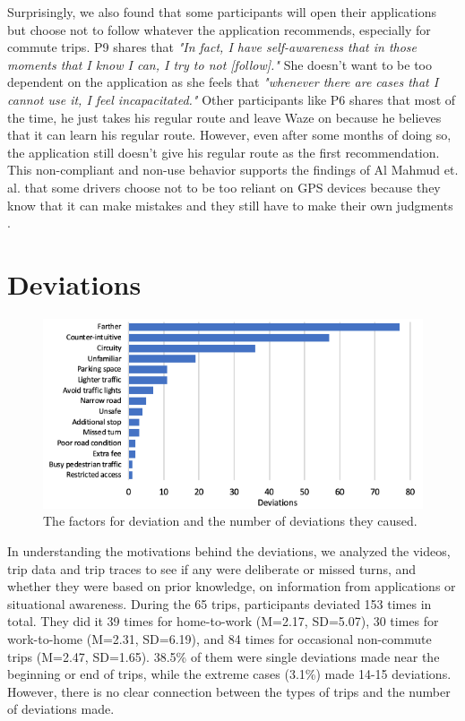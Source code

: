 Surprisingly, we also found that some participants will open their applications but choose not to follow whatever the application recommends, especially for commute trips. P9 shares that \emph{"In fact, I have self-awareness that in those moments that I know I can, I try to not [follow]."} She doesn't want to be too dependent on the application as she feels that \emph{"whenever there are cases that I cannot use it, I feel incapacitated."} Other participants like P6 shares that most of the time, he just takes his regular route and leave Waze on because he believes that it can learn his regular route. However, even after some months of doing so, the application still doesn't give his regular route as the first recommendation. This non-compliant and non-use behavior supports the findings of Al Mahmud et. al. that some drivers choose not to be too reliant on GPS devices because they know that it can make mistakes and they still have to make their own judgments \cite{Mahmud2009UserDrivers}. 

\section{Deviations}

\begin{figure}[h]
  \centering
  \vspace{-0.20cm}
  \centerline{\includegraphics{figures/s1-reason_devs.png}}
  \vspace{-0.30cm}
  \caption{The factors for deviation and the number of deviations they caused.}
  \label{fig:s1-reason_devs}
\end{figure}

In understanding the motivations behind the deviations, we analyzed the videos, trip data and trip traces to see if any were deliberate or missed turns, and whether they were based on prior knowledge, on information from applications or situational awareness. During the 65 trips, participants deviated 153 times in total. They did it 39 times for home-to-work (M=2.17, SD=5.07), 30 times for work-to-home (M=2.31, SD=6.19), and 84 times for occasional non-commute trips (M=2.47, SD=1.65). 38.5\% of them were single deviations made near the beginning or end of trips, while the extreme cases (3.1\%) made 14-15 deviations. However, there is no clear connection between the types of trips and the number of deviations made. 

